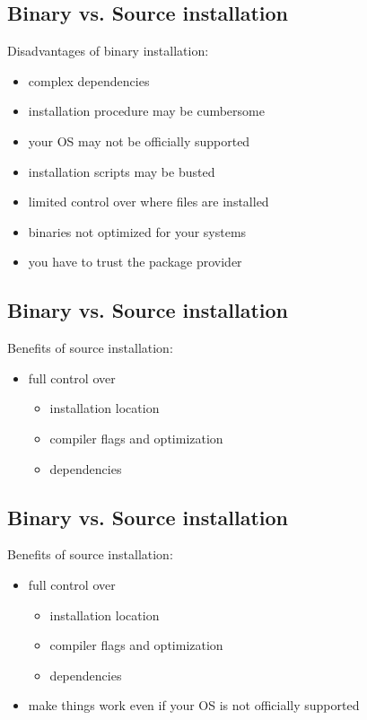 \documentclass[xga]{xdvislides}
\begin{document}
\subsection{Binary vs. Source installation}
Disadvantages of binary installation:
\begin{itemize}
	\item complex dependencies
	\item installation procedure may be cumbersome
	\item your OS may not be officially supported
	\item installation scripts may be busted
	\item limited control over where files are installed
	\item binaries not optimized for your systems
	\item you have to trust the package provider
\end{itemize}


\subsection{Binary vs. Source installation}
Benefits of source installation:
\begin{itemize}
	\item full control over
		\begin{itemize}
			\item installation location
			\item compiler flags and optimization
			\item dependencies
		\end{itemize}
\end{itemize}

\subsection{Binary vs. Source installation}
Benefits of source installation:
\begin{itemize}
	\item full control over
		\begin{itemize}
			\item installation location
			\item compiler flags and optimization
			\item dependencies
		\end{itemize}
	\item make things work even if your OS is not officially supported
\end{itemize}
\end{document}
